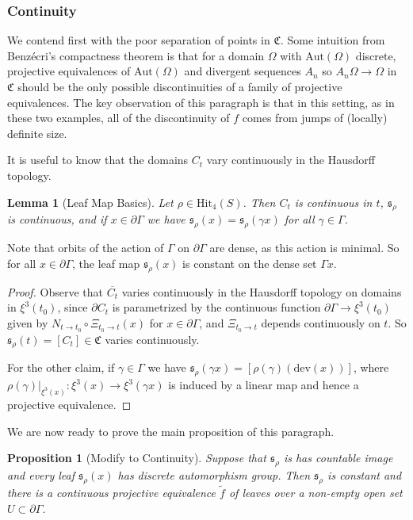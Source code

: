 \documentclass[12pt,a4paper]{amsart}
\theoremstyle{definition}
\theoremstyle{plain}
\newtheorem{proposition}[theorem]{Proposition}
\newtheorem{lemma}[theorem]{Lemma}
\numberwithin{equation}{section}
\begin{document}
\subsubsection{Continuity}\label{subsubsection-discrete-continuity} We contend first with the poor separation of points in $\mathfrak{C}$. Some intuition from Benz\'ecri's compactness theorem is that for a domain $\Omega$ with $\text{Aut}(\Omega)$ discrete, projective equivalences of $\text{Aut}(\Omega)$ and divergent sequences $A_n$ so $A_n \Omega \to \Omega$ in $\mathfrak{C}$ should be the only possible discontinuities of a family of projective equivalences. The key observation of this paragraph is that in this setting, as in these two examples, all of the discontinuity of $f$ comes from jumps of (locally) definite size.

It is useful to know that the domains $C_t$ vary continuously in the Hausdorff topology.

\begin{lemma}[Leaf Map Basics]\label{lemma-leaf-maps-basics}
    Let {\rm{$\rho \in \text{Hit}_4(S)$}}. Then $C_t$ is continuous in $t$, $\mathfrak{s}_\rho$ is continuous, and if $x \in \partial \Gamma$ we have $\mathfrak{s}_\rho(x) = \mathfrak{s}_\rho(\gamma x)$ for all $\gamma \in \Gamma$.
\end{lemma}

Note that orbits of the action of $\Gamma$ on $\partial \Gamma$ are dense, as this action is minimal. So for all $x \in \partial \Gamma$, the leaf map $\mathfrak{s}_\rho(x)$ is constant on the dense set $\Gamma x$.

\begin{proof}
     Observe that $\overline{C_t}$ varies continuously in the Hausdorff topology on domains in $\xi^3(t_0)$, since $\partial C_t$ is parametrized by the continuous function $\partial \Gamma \to \xi^3(t_0)$ given by $N_{t\to t_0} \circ \Xi_{t_0 \to t}(x)$ for $x \in \partial \Gamma$, and $\Xi_{t_0\to t}$ depends continuously on $t$. So $\mathfrak{s}_\rho(t) = [C_t] \in \mathfrak{C}$ varies continuously.
     
     For the other claim, if $\gamma \in \Gamma$ we have $\mathfrak{s}_\rho(\gamma x) = [\rho(\gamma)(\text{dev}(x))]$, where $\rho(\gamma)|_{\xi^3(x)} : \xi^3(x) \to \xi^3(\gamma x)$ is induced by a linear map and hence a projective equivalence.
\end{proof}

We are now ready to prove the main proposition of this paragraph.

\begin{proposition}[Modify to Continuity]\label{key-reduction}
    Suppose that $\mathfrak{s}_\rho$ is has countable image and every leaf $\mathfrak{s}_\rho(x)$ has discrete automorphism group. Then $\mathfrak{s}_\rho$ is constant and there is a continuous projective equivalence $\widetilde{f}$ of leaves over a non-empty open set $U \subset \partial \Gamma$.
\end{proposition}
\end{document}
